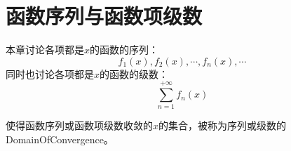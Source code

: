 \chapter{函数序列与函数项级数}

本章讨论各项都是$x$的函数的序列：
\begin{equation*}
	f_1(x),f_2(x),\cdots,f_n(x),\cdots
\end{equation*}
同时也讨论各项都是$x$的函数的级数：
\begin{equation*}
\sum_{n=1}^{+\infty}f_n(x)
\end{equation*}
\begin{definition}
	使得函数序列或函数项级数收敛的$x$的集合，被称为序列或级数的\gls{DomainOfConvergence}。
\end{definition}




